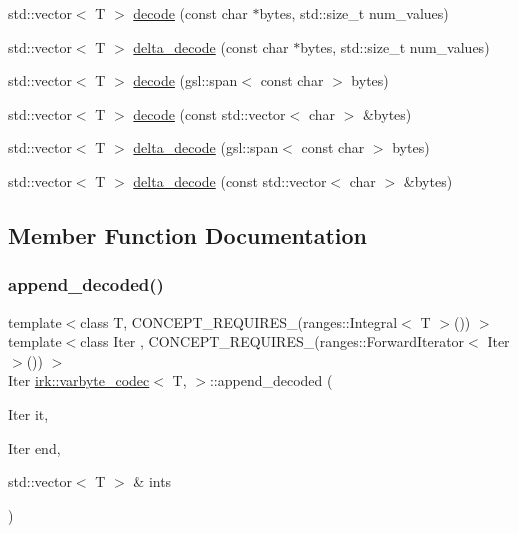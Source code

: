 \begin{DoxyCompactItemize}
\item 
std\+::vector$<$ T $>$ \mbox{\hyperlink{structirk_1_1varbyte__codec_afc4fde2f865f909405516b2294cb35c7}{decode}} (const char $\ast$bytes, std\+::size\+\_\+t num\+\_\+values)
\item 
std\+::vector$<$ T $>$ \mbox{\hyperlink{structirk_1_1varbyte__codec_a404c53206361afe9e8e921a8b5241643}{delta\+\_\+decode}} (const char $\ast$bytes, std\+::size\+\_\+t num\+\_\+values)
\item 
std\+::vector$<$ T $>$ \mbox{\hyperlink{structirk_1_1varbyte__codec_aea37eb3ac306427295ae4ad795efe6d9}{decode}} (gsl\+::span$<$ const char $>$ bytes)
\item 
std\+::vector$<$ T $>$ \mbox{\hyperlink{structirk_1_1varbyte__codec_a416c6640c688c798dc5de3b99c58121d}{decode}} (const std\+::vector$<$ char $>$ \&bytes)
\item 
std\+::vector$<$ T $>$ \mbox{\hyperlink{structirk_1_1varbyte__codec_a82a9ef022440adbc15f615d25bea3d5f}{delta\+\_\+decode}} (gsl\+::span$<$ const char $>$ bytes)
\item 
std\+::vector$<$ T $>$ \mbox{\hyperlink{structirk_1_1varbyte__codec_ad7cc0171f9745b29e76fa8de32356067}{delta\+\_\+decode}} (const std\+::vector$<$ char $>$ \&bytes)
\end{DoxyCompactItemize}


\subsection{Member Function Documentation}
\mbox{\label{structirk_1_1varbyte__codec_ac3f5abee39693d13a69c2aaa24f8095f}} 
\subsubsection{\texorpdfstring{append\+\_\+decoded()}{append\_decoded()}}
{\footnotesize\ttfamily template$<$class T, C\+O\+N\+C\+E\+P\+T\+\_\+\+R\+E\+Q\+U\+I\+R\+E\+S\+\_\+(ranges\+::\+Integral$<$ T $>$()) $>$ \\
template$<$class Iter , C\+O\+N\+C\+E\+P\+T\+\_\+\+R\+E\+Q\+U\+I\+R\+E\+S\+\_\+(ranges\+::\+Forward\+Iterator$<$ Iter $>$()) $>$ \\
Iter \mbox{\hyperlink{structirk_1_1varbyte__codec}{irk\+::varbyte\+\_\+codec}}$<$ T, $>$\+::append\+\_\+decoded (\begin{DoxyParamCaption}\item[{Iter}]{it,  }\item[{Iter}]{end,  }\item[{std\+::vector$<$ T $>$ \&}]{ints }\end{DoxyParamCaption})\hspace{0.3cm}{\ttfamily [inline]}}

